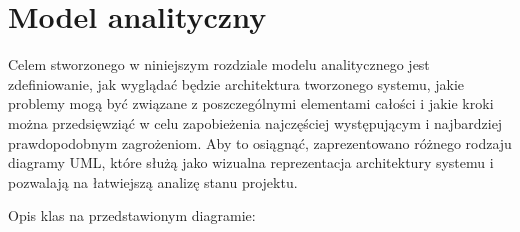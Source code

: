 \newpage
\section{Model analityczny}

Celem stworzonego w niniejszym rozdziale modelu analitycznego jest
zdefiniowanie, jak wyglądać będzie architektura tworzonego systemu, jakie
problemy mogą być związane z poszczególnymi elementami całości i jakie kroki
można przedsięwziąć w celu zapobieżenia najczęściej występującym i najbardziej
prawdopodobnym zagrożeniom. Aby to osiągnąć, zaprezentowano różnego rodzaju
diagramy UML, które służą jako wizualna reprezentacja architektury systemu i
pozwalają na łatwiejszą analizę stanu projektu.



\newpage
Opis klas na przedstawionym diagramie:

